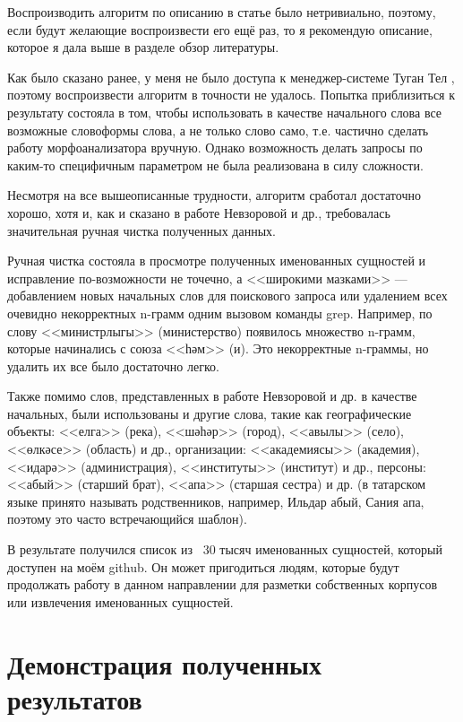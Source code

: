 
Воспроизводить алгоритм по описанию в статье было нетривиально, поэтому, если будут желающие воспроизвести его ещё раз, то я рекомендую описание, которое я дала выше в разделе обзор литературы.

Как было сказано ранее, у меня не было доступа к менеджер-системе Туган Тел \cite{tugan_tel}, поэтому воспроизвести алгоритм в точности не удалось. Попытка приблизиться к результату состояла в том, чтобы использовать в качестве начального слова все возможные словоформы слова, а не только слово само, т.е. частично сделать работу морфоанализатора вручную. Однако возможность делать запросы по каким-то специфичным параметром не была реализована в силу сложности.

Несмотря на все вышеописанные трудности, алгоритм сработал достаточно хорошо, хотя и, как и сказано в работе Невзоровой и др., требовалась значительная ручная чистка полученных данных.

Ручная чистка состояла в просмотре полученных именованных сущностей и исправление по-возможности  не точечно, а <<широкими мазками>> --- добавлением новых начальных слов для поискового запроса или удалением всех очевидно некорректных n-грамм одним вызовом команды grep. Например, по слову <<министрлыгы>> (министерство) появилось множество n-грамм, которые начинались с союза <<һәм>> (и). Это некорректные n-граммы, но удалить их все было достаточно легко. 

Также помимо слов, представленных в работе Невзоровой и др. в качестве начальных, были использованы и другие слова, такие как географические объекты: <<елга>> (река), <<шәһәр>> (город), <<авылы>> (село), <<өлкәсе>> (область) и др., организации:  <<академиясы>> (академия), <<идарә>> (администрация), <<институты>> (институт) и др., персоны: <<абый>> (старший брат), <<апа>> (старшая сестра) и др. (в татарском языке принято называть родственников, например, Ильдар абый, Сания апа, поэтому это часто встречающийся шаблон).

В результате получился список из ~30 тысяч именованных сущностей, который доступен на моём github. %
Он может пригодиться людям, которые будут продолжать работу в данном направлении для разметки собственных корпусов или извлечения именованных сущностей. 

\section{Демонстрация полученных результатов}

